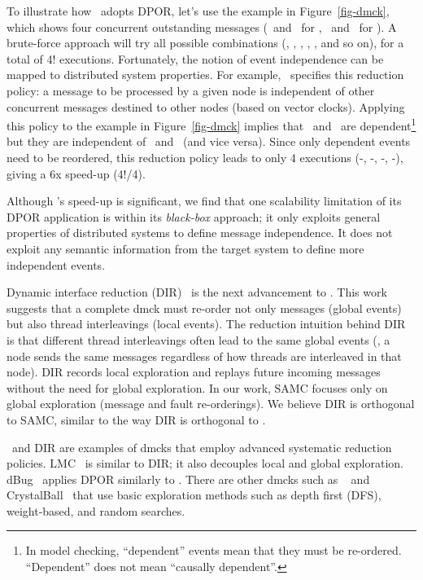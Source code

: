 To illustrate how \modist\ adopts DPOR, let's use the example in
Figure~\ref{fig-dmck}, which shows four concurrent 
outstanding messages 
(\ma\ and \mb\ for \none, \mc\ and \md\ for \ntwo).  A brute-force
approach will try all possible combinations (, ,
, , , and so on), for a total of 4!
executions.
Fortunately, the notion of event independence can be mapped to
distributed system properties.  For example, \modist\ specifies this
reduction policy: a message to be processed by a given node is
independent of other concurrent messages destined to other nodes
(based on vector clocks).  Applying this policy to the example in
Figure~\ref{fig-dmck} implies that \ma\ and \mb\ are
dependent\footnote[1]{In model checking, ``dependent'' events mean
  that they must be re-ordered.  ``Dependent'' does not mean
  ``causally dependent''.}  but they are independent of \mc\ and
\md\ (and vice versa).  Since only dependent events need to be
reordered, this reduction policy leads to only 4 executions
(\ma\mb-\mc\md, \ma\mb-\md\mc, \mb\ma-\mc\md, \mb\ma-\md\mc), giving a
6x speed-up (4!/4).

Although \modist's speed-up is significant, we find that one 
scalability limitation of its DPOR application is within its {\em
  black-box} approach; it only exploits general properties of
distributed systems to define message independence.  It does not
exploit any semantic information from the target system to define more
independent events.  

Dynamic interface reduction (DIR)~\cite{Guo+11-Demeter} is the next
advancement to \modist.  This work suggests that a complete dmck must
re-order not only messages (global events) but also thread
interleavings (local events).  The reduction intuition behind DIR is
that different thread interleavings often lead to the same global
events (\eg, a node sends the same messages regardless of how threads are
interleaved in that node).  DIR records local exploration and replays
future incoming messages without the need for global exploration.
In our work, SAMC focuses only on global exploration (message and fault
re-orderings).  We believe DIR is orthogonal to SAMC, similar to the
way DIR is orthogonal to \modist.

\modist\ and DIR are examples of dmcks that employ advanced systematic
reduction policies.  LMC~\cite{Guerraoui+11-McNoNetwork} is similar to
DIR; it also decouples local and global exploration.
dBug~\cite{Simsa+10-Dbug} applies DPOR similarly to \modist.  There are
other dmcks such as \macemc~\cite{Killian+07-LifeDeathMaceMC} and
CrystalBall~\cite{Yabandeh+09-CrystalBall} that use basic exploration
methods such as depth first (DFS), weight-based,
and random searches.

